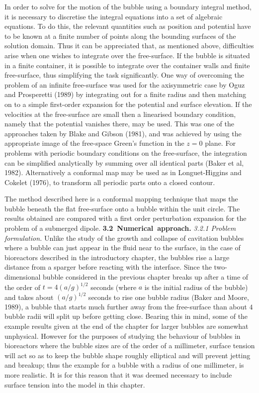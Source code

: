 In order to solve for the motion of the bubble using a boundary
integral method, it is necessary to discretise the integral equations
into a set of algebraic equations. To do this, the relevant 
quantities such as position and potential have to be known at a 
finite number of points along the bounding surfaces of the solution
domain. Thus it can be appreciated that, as mentioned above,
difficulties arise when one wishes to integrate over the free-surface.
If the 
bubble is situated in a finite container, it is possible
to integrate over the container walls 
and finite free-surface, thus simplifying the 
task significantly.
One way of overcoming the problem of an infinite free-surface
was used for the axisymmetric case
by Oguz and Prosperetti (1989) by integrating out for a finite 
radius and then matching on to a simple first-order expansion for
the potential and surface elevation. 
If the velocities at the 
free-surface are small then a linearised boundary
condition, namely that the potential vanishes there,
may be used. This was one of the approaches taken by Blake and 
Gibson (1981), and was achieved by using the appropriate 
image of the free-space Green's function in the $z=0$ plane.
For problems with periodic boundary conditions on the free-surface,
the integration can be simplified analytically by 
summing over all identical parts (Baker et al, 1982).
Alternatively a conformal map may be used as in Longuet-Higgins
and Cokelet (1976), to transform all periodic parts onto 
a closed contour.

The method described here is a conformal mapping technique 
that maps the bubble beneath the 
flat free-surface onto a bubble within the unit circle.
The results obtained are compared with a first order perturbation
expansion for the problem of a submerged dipole.
\pg
\hbox{\bf 3.2 Numerical approach.}
\nobreak
\vskip 15pt
\c{\it 3.2.1 Problem formulation.}
\nobreak
\vskip 5pt
Unlike the study of the growth and collapse of cavitation bubbles
where a bubble can just appear in the fluid near to the surface, 
in the case of bioreactors described in the introductory chapter, the
bubbles rise a large distance from a sparger before reacting 
with the interface.
Since the two-dimensional bubble considered in the previous chapter
breaks up after a time of the order of
$t=4(a/g)^{1/2}$ seconds
(where $a$ is the initial radius of the bubble) and takes about
$(a/g)^{1/2}$ seconds to rise one bubble radius
(Baker and Moore, 1989), 
a bubble that starts much further away from the free-surface than about
$4$ bubble radii will split up before getting close. Bearing this 
in mind, some of the example results given at the end of the 
chapter for larger bubbles are somewhat unphysical.
However for the purposes of 
studying the behaviour of bubbles in bioreactors where 
the bubble sizes are of the order of a millimeter, surface 
tension will act so as to keep the bubble shape roughly elliptical
and will prevent jetting and breakup; thus the example for a
bubble with a radius of one millimeter, is more realistic.
It is for this reason that it was deemed necessary to include 
surface tension into the model in this chapter.

